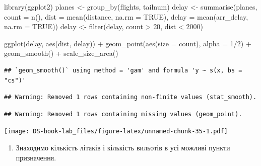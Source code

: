 \documentclass[
]{book}
\newenvironment{Shaded}{\begin{snugshade}}{\end{snugshade}}
\newcommand{\AttributeTok}[1]{\textcolor[rgb]{0.77,0.63,0.00}{#1}}
\newcommand{\ConstantTok}[1]{\textcolor[rgb]{0.00,0.00,0.00}{#1}}
\newcommand{\DecValTok}[1]{\textcolor[rgb]{0.00,0.00,0.81}{#1}}
\newcommand{\FunctionTok}[1]{\textcolor[rgb]{0.00,0.00,0.00}{#1}}
\newcommand{\NormalTok}[1]{#1}
\newcommand{\OtherTok}[1]{\textcolor[rgb]{0.56,0.35,0.01}{#1}}
\newcommand{\SpecialCharTok}[1]{\textcolor[rgb]{0.00,0.00,0.00}{#1}}
\providecommand{\tightlist}{%
  \setlength{\itemsep}{0pt}\setlength{\parskip}{0pt}}
\begin{document}
\begin{Shaded}
\begin{Highlighting}[]
\FunctionTok{library}\NormalTok{(ggplot2)}
\NormalTok{planes }\OtherTok{\textless{}{-}} \FunctionTok{group\_by}\NormalTok{(flights, tailnum)}
\NormalTok{delay }\OtherTok{\textless{}{-}} \FunctionTok{summarise}\NormalTok{(planes,}
  \AttributeTok{count =} \FunctionTok{n}\NormalTok{(),}
  \AttributeTok{dist =} \FunctionTok{mean}\NormalTok{(distance, }\AttributeTok{na.rm =} \ConstantTok{TRUE}\NormalTok{),}
  \AttributeTok{delay =} \FunctionTok{mean}\NormalTok{(arr\_delay, }\AttributeTok{na.rm =} \ConstantTok{TRUE}\NormalTok{))}
\NormalTok{delay }\OtherTok{\textless{}{-}} \FunctionTok{filter}\NormalTok{(delay, count }\SpecialCharTok{\textgreater{}} \DecValTok{20}\NormalTok{, dist }\SpecialCharTok{\textless{}} \DecValTok{2000}\NormalTok{)}

\FunctionTok{ggplot}\NormalTok{(delay, }\FunctionTok{aes}\NormalTok{(dist, delay)) }\SpecialCharTok{+}
  \FunctionTok{geom\_point}\NormalTok{(}\FunctionTok{aes}\NormalTok{(}\AttributeTok{size =}\NormalTok{ count), }\AttributeTok{alpha =} \DecValTok{1}\SpecialCharTok{/}\DecValTok{2}\NormalTok{) }\SpecialCharTok{+}
  \FunctionTok{geom\_smooth}\NormalTok{() }\SpecialCharTok{+}
  \FunctionTok{scale\_size\_area}\NormalTok{()}
\end{Highlighting}
\end{Shaded}

\begin{verbatim}
## `geom_smooth()` using method = 'gam' and formula 'y ~ s(x, bs = "cs")'
\end{verbatim}

\begin{verbatim}
## Warning: Removed 1 rows containing non-finite values (stat_smooth).
\end{verbatim}

\begin{verbatim}
## Warning: Removed 1 rows containing missing values (geom_point).
\end{verbatim}

\texttt{[image: DS-book-lab\_files/figure-latex/unnamed-chunk-35-1.pdf]}

\begin{enumerate}
\def\labelenumi{\arabic{enumi}.}
\setcounter{enumi}{7}
\tightlist
\item
  Знаходимо кількість літаків і кількість вильотів в усі можливі пункти призначення.
\end{enumerate}
\end{document}
